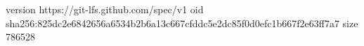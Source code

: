 version https://git-lfs.github.com/spec/v1
oid sha256:825dc2e6842656a6534b2b6a13c667cfddc5e2dc85f0d0efc1b667f2e63ff7a7
size 786528
